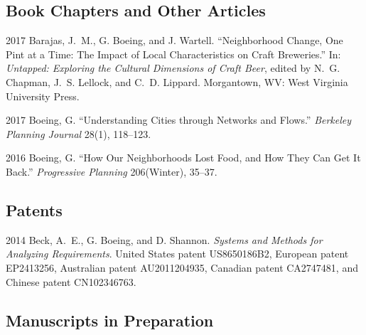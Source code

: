 \documentclass[12pt,letterpaper]{report}
\begin{document}
\subsection*{Book Chapters and Other Articles}

\begin{tablist}

\item[2017] \tab Barajas, J.~M., G. Boeing, and J. Wartell. \enquote{Neighborhood Change, One Pint at a Time: The Impact of Local Characteristics on Craft Breweries.} In: \emph{Untapped: Exploring the Cultural Dimensions of Craft Beer}, edited by N.~G. Chapman, J.~S. Lellock, and C.~D. Lippard. Morgantown, WV: West Virginia University Press.

\item[2017] \tab Boeing, G. \enquote{Understanding Cities through Networks and Flows.} \emph{Berkeley Planning Journal} 28(1), 118--123.

\item[2016] \tab Boeing, G. \enquote{How Our Neighborhoods Lost Food, and How They Can Get It Back.} \emph{Progressive Planning} 206(Winter), 35--37.

\end{tablist}



\subsection*{Patents}

\begin{tablist}

\item[2014] \tab Beck, A.~E., G. Boeing, and D. Shannon. \emph{Systems and Methods for Analyzing Requirements}. United States patent US8650186B2, European patent EP2413256, Australian patent AU2011204935, Canadian patent CA2747481, and Chinese patent CN102346763.

\end{tablist}



\subsection*{Manuscripts in Preparation}
\end{document}
